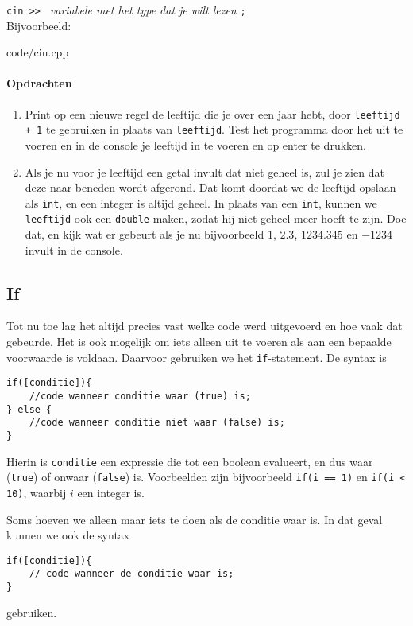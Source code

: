 \documentclass[12pt,a4paper]{article}
\newcommand{\code}{}
\newcommand{\icode}{\lstinline}
\begin{document}
\icode{cin >> } \emph{variabele met het type dat je wilt lezen} \icode{;}\\

Bijvoorbeeld:

\code{code/cin.cpp}
\paragraph{Opdrachten}
\begin{enumerate}
	\item Print op een nieuwe regel de leeftijd die je over een jaar hebt, door \icode{leeftijd + 1} te gebruiken in plaats van \icode{leeftijd}.
		Test het programma door het uit te voeren en in de console je leeftijd in te voeren en op enter te drukken.
	\item
		Als je nu voor je leeftijd een getal invult dat niet geheel is, zul je zien dat deze naar beneden wordt afgerond. Dat komt doordat we de leeftijd opslaan als \icode{int}, en een integer is altijd geheel.
		In plaats van een \icode{int}, kunnen we \icode{leeftijd} ook een \icode{double} maken, zodat hij niet geheel meer hoeft te zijn. Doe dat, en kijk wat er gebeurt als je nu bijvoorbeeld $1$, $2.3$, $1234.345$ en $-1234$ invult in de console.
\end{enumerate}


\subsection{If}
Tot nu toe lag het altijd precies vast welke code werd uitgevoerd en hoe vaak dat gebeurde. Het is ook mogelijk om iets alleen uit te voeren als aan een bepaalde voorwaarde is voldaan. Daarvoor gebruiken we het \icode{if}-statement. De syntax is
\begin{lstlisting}
if([conditie]){
	//code wanneer conditie waar (true) is;
} else {
	//code wanneer conditie niet waar (false) is;
}
\end{lstlisting}
Hierin is \icode{conditie} een expressie die tot een boolean evalueert, en dus waar (\icode{true}) of onwaar (\icode{false}) is. Voorbeelden zijn bijvoorbeeld \icode{if(i == 1)} en \icode{if(i < 10)}, waarbij $i$ een integer is. 

Soms hoeven we alleen maar iets te doen als de conditie waar is. In dat geval kunnen we ook de syntax
\begin{lstlisting}
if([conditie]){
	// code wanneer de conditie waar is;
}
\end{lstlisting}
gebruiken.
\end{document}
